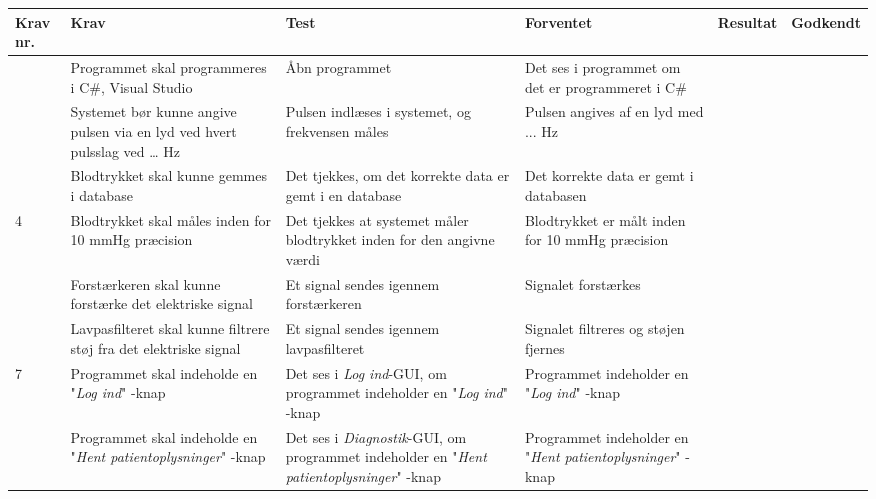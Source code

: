 \begin{longtable}{|>{\raggedright\arraybackslash}p{1.1cm}| >{\raggedright\arraybackslash}p{2.7cm} | >{\raggedright\arraybackslash}p{2.7cm} | >{\raggedright\arraybackslash}p{2.7cm} | >{\raggedright\arraybackslash}p{2.2cm} |>{\raggedright\arraybackslash}p{2.2cm}|}
   \hline
\textbf{Krav nr.} & \textbf{Krav}	&	\textbf{Test}	&	\textbf{Forventet}	&\textbf{Resultat}	&	\textbf{Godkendt} \\
\hline
1	&	Programmet skal programmeres i C$\#$, Visual Studio &	 Åbn programmet	& 	Det ses i programmet om det er programmeret i C$\#$	&	\\
\hline
2	&	Systemet bør kunne angive pulsen via en lyd ved hvert pulsslag ved … Hz &	 Pulsen indlæses i systemet, og frekvensen måles 	&	Pulsen angives af en lyd med ... Hz	&	\\
\hline
3	&	Blodtrykket skal kunne gemmes i database &	 Det tjekkes, om det korrekte data er gemt i en database 	&	Det korrekte data er gemt i databasen	&	\\
\hline
4	&	Blodtrykket skal måles inden for 10 mmHg præcision &	 Det tjekkes at systemet måler blodtrykket inden for den angivne værdi 	&	Blodtrykket er målt inden for 10 mmHg præcision	&	\\
\hline
5	&	Forstærkeren skal kunne forstærke det elektriske signal &	 Et signal sendes igennem forstærkeren	&	Signalet forstærkes	&	\\
\hline
6	&	Lavpasfilteret skal kunne filtrere støj fra det elektriske signal &	 Et signal sendes igennem lavpasfilteret	&	Signalet filtreres og støjen fjernes	&	\\
\hline
7	&	Programmet skal indeholde en "\textit{Log ind}"\- -knap &	 Det ses i \textit{Log ind}-GUI, om programmet indeholder en "\textit{Log ind}"\- -knap 	&	Programmet indeholder en "\textit{Log ind}"\- -knap	&	\\
\hline
8	&	Programmet skal indeholde en "\textit{Hent patientoplysninger}"\- -knap &	 Det ses i \textit{Diagnostik}-GUI, om programmet indeholder en "\textit{Hent patientoplysninger}"\- -knap 	&	Programmet indeholder en "\textit{Hent patientoplysninger}"\- -knap	&	\\

\end{longtable}
